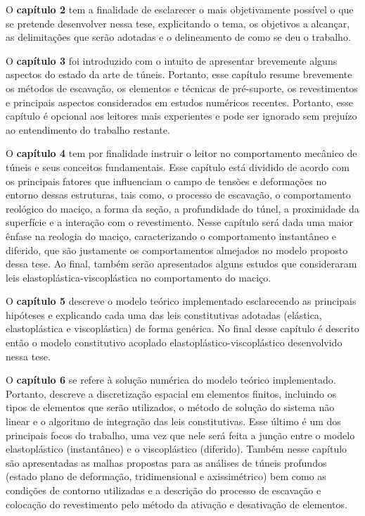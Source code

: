 O \textbf{capítulo 2} tem a finalidade de esclarecer o mais objetivamente possível o que se pretende desenvolver nessa tese, explicitando o tema, os objetivos a alcançar, as delimitações que serão adotadas e o delineamento de como se deu o trabalho.

O \textbf{capítulo 3} foi introduzido com o intuito de apresentar brevemente alguns aspectos do estado da arte de túneis. Portanto, esse capítulo resume brevemente os métodos de escavação, os elementos e técnicas de pré-suporte, os revestimentos e principais aspectos considerados em estudos numéricos recentes. Portanto, esse capítulo é opcional aos leitores mais experientes e pode ser ignorado sem prejuízo ao entendimento do trabalho restante.

O \textbf{capítulo 4} tem por finalidade instruir o leitor no comportamento mecânico de túneis e seus conceitos fundamentais. Esse capítulo está dividido de acordo com os principais fatores que influenciam o campo de tensões e deformações no entorno dessas estruturas, tais como, o processo de escavação, o comportamento reológico do maciço, a forma da seção, a profundidade do túnel, a proximidade da superfície e a interação com o revestimento. Nesse capítulo será dada uma maior ênfase na reologia do maciço, caracterizando o comportamento instantâneo e diferido, que são justamente os comportamentos almejados no modelo proposto dessa tese. Ao final, também serão apresentados alguns estudos que consideraram leis elastoplástica-viscoplástica no comportamento do maciço.

O \textbf{capítulo 5} descreve o modelo teórico implementado esclarecendo as principais hipóteses e explicando cada uma das leis constitutivas adotadas (elástica, elastoplástica e viscoplástica) de forma genérica. No final desse capítulo é descrito então o modelo constitutivo acoplado elastoplástico-viscoplástico desenvolvido nessa tese.

O \textbf{capítulo 6} se refere à solução numérica do modelo teórico implementado. Portanto, descreve a discretização espacial em elementos finitos, incluindo os tipos de elementos que serão utilizados, o método de solução do sistema não linear e o algoritmo de integração das leis constitutivas. Esse último é um dos principais focos do trabalho, uma vez que nele será feita a junção entre o modelo elastoplástico (instantâneo) e o viscoplástico (diferido). Também nesse capítulo são apresentadas as malhas propostas para as análises de túneis profundos (estado plano de deformação, tridimensional e axissimétrico) bem como as condições de contorno utilizadas e a descrição do processo de escavação e colocação do revestimento pelo método da ativação e desativação de elementos.

